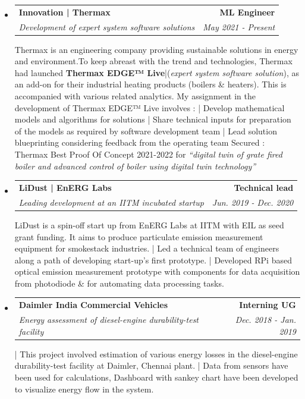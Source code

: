 \documentclass[letterpaper,11pt]{article}
\makeatletter
\newlength{\outerbordwidth}
\newcommand{\resheading}[1]{\vspace{8pt}
  \parbox{\textwidth}{\setlength{\FrameSep}{\outerbordwidth}
    \begin{shaded}
\setlength{\fboxsep}{0pt}\framebox[\textwidth][l]{\setlength{\fboxsep}{4pt}\fcolorbox{shadecolorB}{shadecolorB}{\textbf{\sffamily{\mbox{~}\makebox[6.762in][l]{\large #1} \vphantom{p\^{E}}}}}}
    \end{shaded}
  }\vspace{-5pt}
}
\newcommand{\ressubheading}[4]{
\begin{tabular*}{6.5in}{l@{\cftdotfill{\cftsecdotsep}\extracolsep{\fill}}r}
		\textbf{#1} & \textbf{#2} \\
		\textit{#3} & \textit{#4} \\
\end{tabular*}\vspace{-6pt}}
\makeatother
\begin{document}
\resheading{Experience}
\begin{itemize}
\item 
    \ressubheading{Innovation | Thermax}{ML Engineer}{Development of expert system software solutions}{May 2021 - Present}
	\newline \newline Thermax is an engineering company providing sustainable solutions in energy and environment.\newline To keep abreast with the trend and technologies, Thermax had launched \textbf{Thermax EDGE™ Live}|(\textit{expert system software solution}), as an add-on for their industrial heating products (boilers \& heaters). This is accompanied with various related analytics. 
	\newline My assignment in the development of Thermax EDGE™ Live involves : 
	\newline | Develop mathematical models and algorithms for solutions
	\newline | Share technical inputs for preparation of the models as required by software development team
	\newline | Lead solution blueprinting considering feedback from the operating team
	\newline Secured : Thermax Best Proof Of Concept 2021-2022 for \textit{``digital twin of grate fired boiler and advanced control of boiler using digital twin technology''}
	
\item
	\ressubheading{LiDust | EnERG Labs}{Technical lead}{Leading development at an IITM incubated startup}{Jun. 2019 - Dec. 2020}
	\newline \newline LiDust is a spin-off start up from EnERG Labs at IITM with EIL as seed grant funding. 
	It aims to produce particulate emission measurement equipment for smokestack industries.
	\newline | Led a technical team of engineers along a path of developing start-up's first prototype.
	\newline | Developed RPi based optical emission measurement prototype with components for data acquisition from photodiode \& for automating data processing tasks. 
\item
	\ressubheading{Daimler India Commercial Vehicles}{Interning UG}{Energy assessment of diesel-engine durability-test facility}{Dec. 2018 - Jan. 2019}
	\newline \newline | This project involved estimation of various energy losses in the diesel-engine durability-test facility at Daimler, Chennai plant.
	\newline | Data from sensors have been used for calculations, Dashboard with sankey chart have been developed to visualize energy flow in the system.
\end{itemize}
\end{document}
